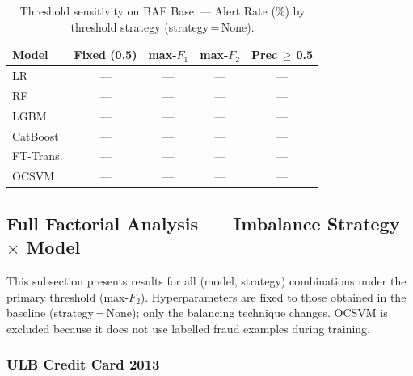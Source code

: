 \begin{table}[ht]
\centering
\caption{Threshold sensitivity on BAF Base~--- Alert Rate (\%) by threshold strategy (strategy\,=\,None).}
\label{tab:threshold_baf_alert}
\begin{tabular}{l c c c c}
\toprule
Model & Fixed (0.5) & max-$F_1$ & max-$F_2$ & Prec\,$\geq$\,0.5 \\
\midrule
LR        & --- & --- & --- & --- \\
RF        & --- & --- & --- & --- \\
LGBM      & --- & --- & --- & --- \\
CatBoost  & --- & --- & --- & --- \\
FT-Trans. & --- & --- & --- & --- \\
OCSVM     & --- & --- & --- & --- \\
\bottomrule
\end{tabular}
\end{table}




\subsection{Full Factorial Analysis~--- Imbalance Strategy $\times$ Model}
\label{sec:factorial_results}

This subsection presents results for all (model, strategy) combinations
under the primary threshold (max-$F_2$).
Hyperparameters are fixed to those obtained in the baseline (strategy\,=\,None);
only the balancing technique changes.
OCSVM is excluded because it does not use labelled fraud examples during training.


\subsubsection{ULB Credit Card 2013}

